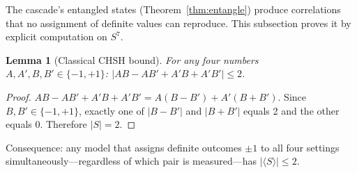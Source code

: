 \documentclass[12pt,a4paper]{article}
\newtheorem{lemma}[theorem]{Lemma}
\begin{document}
The cascade's entangled states (Theorem~\ref{thm:entangle}) produce correlations that no
assignment of definite values can reproduce. This subsection proves it by explicit
computation on $S^7$.

\begin{lemma}[Classical CHSH bound]\label{lem:chsh}
For any four numbers $A,A',B,B'\in\{-1,+1\}$:
$|AB - AB' + A'B + A'B'|\leq 2$.
\end{lemma}
\begin{proof}
$AB - AB' + A'B + A'B' = A(B-B')+A'(B+B')$. Since $B,B'\in\{-1,+1\}$, exactly one of
$|B-B'|$ and $|B+B'|$ equals 2 and the other equals 0. Therefore $|S|=2$.
\end{proof}

\noindent Consequence: any model that assigns definite outcomes $\pm 1$ to all four
settings simultaneously---regardless of which pair is measured---has
$|\langle S\rangle|\leq 2$.
\end{document}
